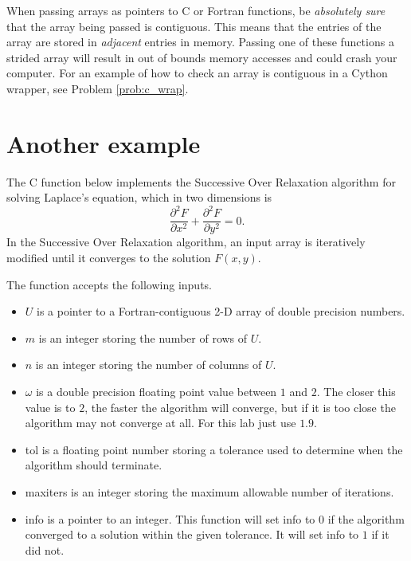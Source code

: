

\begin{warn}
When passing arrays as pointers to C or Fortran functions, be \emph{absolutely sure} that the array being passed is contiguous.
This means that the entries of the array are stored in \emph{adjacent} entries in memory.
Passing one of these functions a strided array will result in out of bounds memory accesses and could crash your computer.
For an example of how to check an array is contiguous in a Cython wrapper, see Problem \ref{prob:c_wrap}.
\end{warn}



\section*{Another example}


The C function  below implements the Successive Over Relaxation algorithm for solving Laplace's equation, which in two dimensions is
\[
\frac{\partial^2 F}{\partial x^2} + \frac{\partial^2 F}{\partial y^2} = 0.
\]
In the Successive Over Relaxation algorithm, an input array is iteratively modified until it converges to the solution $F(x,y)$.



The function  accepts the following inputs.
\begin{itemize}
\item $U$ is a pointer to a Fortran-contiguous 2-D array of double precision numbers.
\item $m$ is an integer storing the number of rows of $U$.
\item $n$ is an integer storing the number of columns of $U$.
\item $\omega$ is a double precision floating point value between $1$ and $2$.
The closer this value is to $2$, the faster the algorithm will converge, but if it is too close the algorithm may not converge at all.
For this lab just use $1.9$.
\item tol is a floating point number storing a tolerance used to determine when the algorithm should terminate.
\item maxiters is an integer storing the maximum allowable number of iterations.
\item info is a pointer to an integer.
This function will set info to $0$ if the algorithm converged to a solution within the given tolerance.
It will set info to $1$ if it did not.
\end{itemize}



